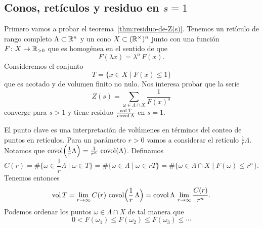 
\subsection{Conos, retículos y residuo en $s = 1$}
\label{sec:conos-reticulos-y-residuo-en-s=1}

Primero vamos a probar el teorema~\ref{thm:residuo-de-Z(s)}.
Tenemos un retículo de rango completo $\Lambda \subset \mathbb{R}^n$ y un cono
$X \subset (\mathbb{R}^\times)^n$ junto con una función $F\colon X\to \mathbb{R}_{>0}$ que es
homogénea en el sentido de que
$$F (\lambda x) = \lambda^n\,F (x).$$
Consideremos el conjunto
$$T = \{ x \in X \mid F (x) \le 1 \}$$
que es acotado y de volumen finito no nulo. Nos interesa probar que la serie
$$Z (s) = \sum_{\omega \in \Lambda \cap X} \frac{1}{F (x)^s}$$
converge para $s > 1$ y tiene residuo $\frac{\operatorname{vol} T}{\operatorname{covol} \Lambda}$ en
$s = 1$.

\vspace{1em}

El punto clave es una interpretación de volúmenes en términos del conteo de
puntos en retículos. Para un parámetro $r > 0$ vamos a considerar el retículo
$\frac{1}{r}\Lambda$. Notamos que
$\operatorname{covol}\Bigl(\frac{1}{r}\Lambda\Bigr) = \frac{1}{r^n}\,\operatorname{covol} (\Lambda)$.
Definamos
\[ C (r) = \# \{ \omega \in \frac{1}{r}\Lambda \mid \omega \in T \}
         = \# \{ \omega \in \Lambda \mid \omega \in rT \}
         = \# \{ \omega \in \Lambda \cap X \mid F (\omega) \le r^n \}. \]
Tenemos entonces
\[ \operatorname{vol} T = \lim_{r\to\infty} C (r) \, \operatorname{covol} \Bigl(\frac{1}{r}\,\Lambda\Bigr)
          = \operatorname{covol} \Lambda \, \lim_{r\to\infty} \frac{C(r)}{r^n}. \]
Podemos ordenar los puntos $\omega \in \Lambda \cap X$ de tal manera que
$$0 < F (\omega_1) \le F (\omega_2) \le F (\omega_3) \le \cdots$$


